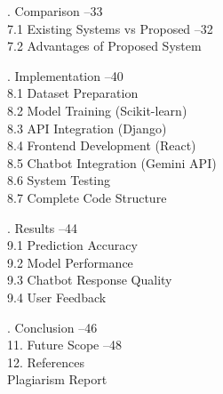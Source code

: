 \documentclass[12pt,a4paper]{report}
\begin{document}
\vspace{0.5cm}

. Comparison --33\\
\hspace{0.5cm}7.1 Existing Systems vs Proposed --32\\
\hspace{0.5cm}7.2 Advantages of Proposed System \\

\vspace{0.5cm}

. Implementation --40\\
\hspace{0.5cm}8.1 Dataset Preparation \\
\hspace{0.5cm}8.2 Model Training (Scikit-learn) \\
\hspace{0.5cm}8.3 API Integration (Django) \\
\hspace{0.5cm}8.4 Frontend Development (React) \\
\hspace{0.5cm}8.5 Chatbot Integration (Gemini API) \\
\hspace{0.5cm}8.6 System Testing \\
\hspace{0.5cm}8.7 Complete Code Structure \\

\vspace{0.5cm}

. Results --44\\
\hspace{0.5cm}9.1 Prediction Accuracy \\
\hspace{0.5cm}9.2 Model Performance \\
\hspace{0.5cm}9.3 Chatbot Response Quality \\
\hspace{0.5cm}9.4 User Feedback \\

\vspace{0.5cm}

. Conclusion --46\\
11. Future Scope --48\\
12. References \\
Plagiarism Report \\
\end{document}

